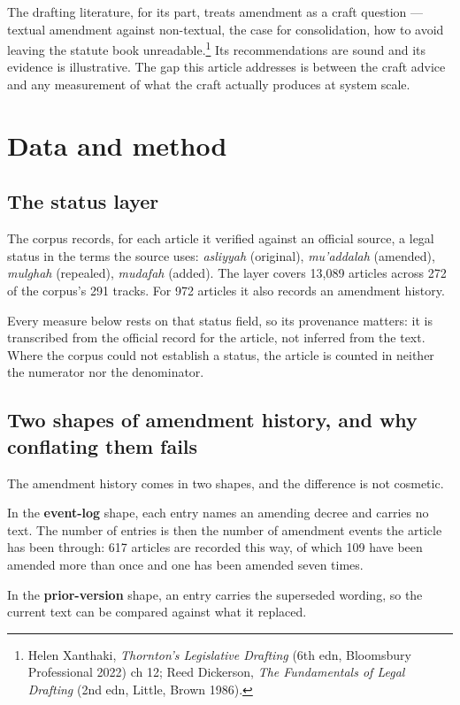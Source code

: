 \documentclass[11pt]{article}
\begin{document}
The drafting literature, for its part, treats amendment as a craft question
--- textual amendment against non-textual, the case for consolidation, how to
avoid leaving the statute book unreadable.\footnote{Helen Xanthaki,
\emph{Thornton's Legislative Drafting} (6th edn, Bloomsbury Professional
2022) ch 12; Reed Dickerson, \emph{The Fundamentals of Legal Drafting} (2nd
edn, Little, Brown 1986).} Its recommendations are sound and its evidence is
illustrative. The gap this article addresses is between the craft advice and
any measurement of what the craft actually produces at system scale.

\section{Data and method}
\label{sec:method}

\subsection{The status layer}

The corpus records, for each article it verified against an official source, a
legal status in the terms the source uses: \emph{asliyyah} (original),
\emph{mu'addalah} (amended), \emph{mulghah} (repealed), \emph{mudafah}
(added). The layer covers 13,089 articles across 272 of the corpus's 291
tracks. For 972 articles it also records an amendment history.

Every measure below rests on that status field, so its provenance matters: it
is transcribed from the official record for the article, not inferred from the
text. Where the corpus could not establish a status, the article is counted in
neither the numerator nor the denominator.

\subsection{Two shapes of amendment history, and why conflating them fails}

The amendment history comes in two shapes, and the difference is not
cosmetic.

In the \textbf{event-log} shape, each entry names an amending decree and
carries no text. The number of entries is then the number of amendment events
the article has been through: 617 articles are recorded this way, of which 109
have been amended more than once and one has been amended seven times.

In the \textbf{prior-version} shape, an entry carries the superseded wording,
so the current text can be compared against what it replaced.
\end{document}
